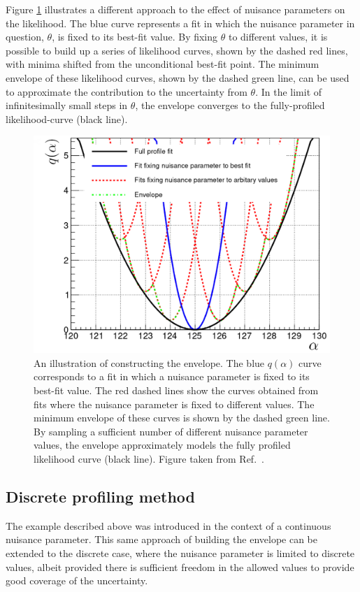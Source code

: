 Figure \ref{fig:nuisance_illustration} illustrates a different approach to the effect of nuisance parameters on the likelihood. The blue curve represents a fit in which the nuisance parameter in question, $\theta$, is fixed to its best-fit value. By fixing $\theta$ to different values, it is possible to build up a series of likelihood curves, shown by the dashed red lines, with minima shifted from the unconditional best-fit point. The minimum envelope of these likelihood curves, shown by the dashed green line, can be used to approximate the contribution to the uncertainty from $\theta$. In the limit of infinitesimally small steps in $\theta$, the envelope converges to the fully-profiled likelihood-curve (black line).

\begin{figure}
  \centering
  \includegraphics[width=.6\textwidth]{Figures/hgg_stats/nuisance_illustration.pdf}
  \caption[Constructing the envelope]
  {
    An illustration of constructing the envelope. The blue $q(\alpha)$ curve corresponds to a fit in which a nuisance parameter is fixed to its best-fit value. The red dashed lines show the curves obtained from fits where the nuisance parameter is fixed to different values. The minimum envelope of these curves is shown by the dashed green line. By sampling a sufficient number of different nuisance parameter values, the envelope approximately models the fully profiled likelihood curve (black line). Figure taken from Ref.~\cite{Dauncey:2014xga}.
  }
  \label{fig:nuisance_illustration}
\end{figure}

\subsection{Discrete profiling method}
The example described above was introduced in the context of a continuous nuisance parameter. This same approach of building the envelope can be extended to the discrete case, where the nuisance parameter is limited to discrete values, albeit provided there is sufficient freedom in the allowed values to provide good coverage of the uncertainty.

